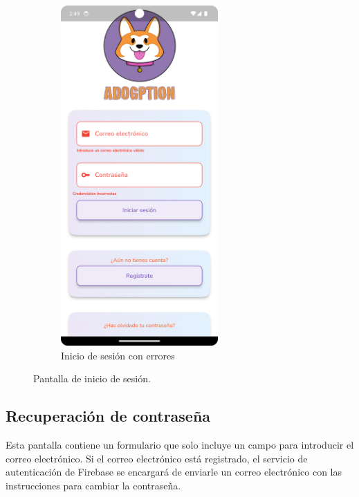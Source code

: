 \documentclass[a4paper, 12pt]{article}
\begin{document}
\begin{figure}[H]
\begin{subfigure}{0.48\textwidth}
\begin{center}
			{\includegraphics[width=6cm]{app/LoginWithErrors.png}\par}
			\caption{Inicio de sesión con errores}
		\end{center}  
	\end{subfigure}\hfill
	\caption{Pantalla de inicio de sesión.}\label{fig:login}
\end{figure}



\newpage
\subsection*{Recuperación de contraseña}

Esta pantalla contiene un formulario que solo incluye un campo para introducir el correo electrónico. Si el correo electrónico está registrado, el servicio de autenticación de Firebase se encargará de enviarle un correo electrónico con las instrucciones para cambiar la contraseña.
\end{document}
